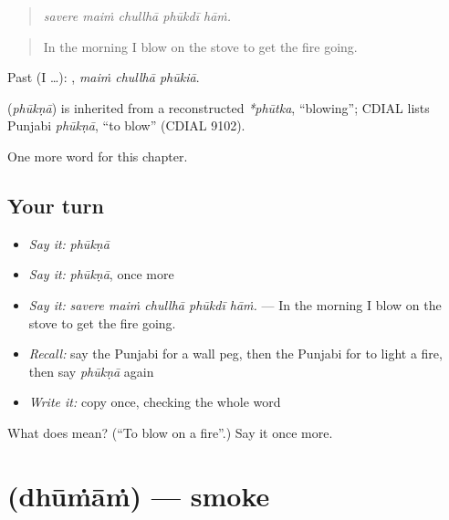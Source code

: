\begin{quote}
    
\end{quote}

\begin{quote}
\emph{savere maiṁ chullhā phūkdī hāṁ.}
\end{quote}

\begin{quote}
In the morning I blow on the stove to get the fire going.
\end{quote}

Past (I …):   , \emph{maiṁ chullhā phūkiā}.

\begin{cousinweb}
\textbf{} (\emph{phūkṇā}) is inherited from a reconstructed \emph{*phūtka}, \textquotedblleft{}blowing\textquotedblright{}; CDIAL lists Punjabi \emph{phūkṇā}, \textquotedblleft{}to blow\textquotedblright{} (CDIAL 9102).
\end{cousinweb}

\begin{grammarlens}[title={What you've built}]
One more word for this chapter.
\end{grammarlens}

\subsection*{Your turn}
\begin{itemize}
\raggedright
  \item \emph{Say it:} \emph{phūkṇā}
  \item \emph{Say it:} \emph{phūkṇā}, once more
  \item \emph{Say it:} \emph{savere maiṁ chullhā phūkdī hāṁ.} — In the morning I blow on the stove to get the fire going.
  \item \emph{Recall:} say the Punjabi for a wall peg, then the Punjabi for to light a fire, then say \emph{phūkṇā} again
  \item \emph{Write it:} copy \textbf{} once, checking the whole word
\end{itemize}

\begin{tcolorbox}[breakable,colback=teal!4,colframe=teal!35!black,title={Before you move on}]
What does  mean? (\textquotedblleft{}To blow on a fire\textquotedblright{}.) Say it once more.
\end{tcolorbox}
\section[\texorpdfstring{\pa{ਧੂੰਆਂ} (dhūṁāṁ)}{ਧੂੰਆਂ (dhūṁāṁ)}]{ (dhūṁāṁ) — smoke}

